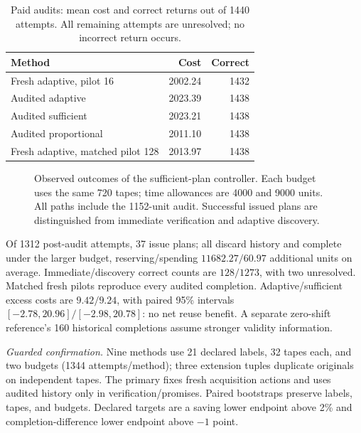 \begin{table}[t]
\centering\small
\caption{Paid audits: mean cost and correct returns out of 1440 attempts. All remaining attempts are unresolved; no incorrect return occurs.}
\label{tab:validity-study-overall}
\begin{tabular}{@{}lrr@{}}
\toprule
Method &Cost&Correct\\
\midrule
Fresh adaptive, pilot 16&2002.24&1432\\
Audited adaptive&2023.39&1438\\
Audited sufficient&2023.21&1438\\
Audited proportional&2011.10&1438\\
Fresh adaptive, matched pilot 128&2013.97&1438\\
\bottomrule
\end{tabular}
\end{table}
\begin{figure}[t]
\centering
\resizebox{\columnwidth}{!}{}
\caption{Observed outcomes of the sufficient-plan controller. Each budget
uses the same 720 tapes; time allowances are 4000 and 9000 units. All paths
include the 1152-unit audit. Successful issued plans are distinguished from
immediate verification and adaptive discovery.}
\label{fig:validity-outcomes}
\end{figure}
Of 1312 post-audit attempts, 37 issue plans; all discard history and complete under the larger budget, reserving/spending $11682.27/60.97$ additional units on average. Immediate/discovery correct counts are $128/1273$, with two unresolved. Matched fresh pilots reproduce every audited completion. Adaptive/sufficient excess costs are $9.42/9.24$, with paired 95\% intervals $[-2.78,20.96]/[-2.98,20.78]$: no net reuse benefit. A separate zero-shift reference's 160 historical completions assume stronger validity information.

\label{app:v37-study}
\emph{Guarded confirmation.} Nine methods use 21 declared labels, 32 tapes each, and two budgets (1344 attempts/method); three extension tuples duplicate originals on independent tapes. The primary fixes fresh acquisition actions and uses audited history only in verification/promises. Paired bootstraps preserve labels, tapes, and budgets. Declared targets are a saving lower endpoint above 2\% and completion-difference lower endpoint above $-1$ point.

